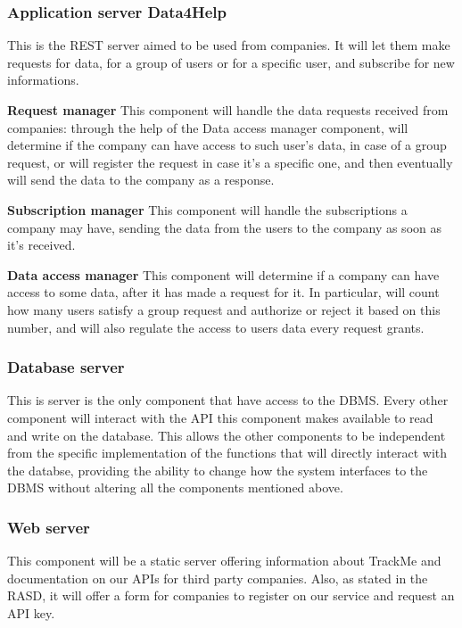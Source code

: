\documentclass[../main.tex]{subfiles}
\begin{document}
\subsubsection{Application server Data4Help} This is the REST server aimed to be used from companies. It will let them make requests for data, for a group of users or for a specific user, and subscribe for new informations.

\begin{description}

	\item{\bf Request manager} This component will handle the data requests received from companies: through the help of the Data access manager component, will determine if the company can have access to such user's data, in case of a group request, or will register the request in case it's a specific one, and then eventually will send the data to the company as a response.

	\item{\bf Subscription manager} This component will handle the subscriptions a company may have, sending the data from the users to the company as soon as it's received.

	\item{\bf Data access manager} This component will determine if a company can have access to some data, after it has made a request for it. In particular, will count how many users satisfy a group request and authorize or reject it based on this number, and will also regulate the access to users data every request grants.

\end{description}

\subsubsection{Database server} This is server is the only component that have access to the DBMS. Every other component will interact with the API this component makes available to read and write on the database. This allows the other components to be independent from the specific implementation of the functions that will directly interact with the databse, providing the ability to change how the system interfaces to the DBMS without altering all the components mentioned above.

\subsubsection{Web server} This component will be a static server offering information about TrackMe and documentation on our APIs for third party companies. Also, as stated in the RASD, it will offer a form for companies to register on our service and request an API key.
\end{document}

